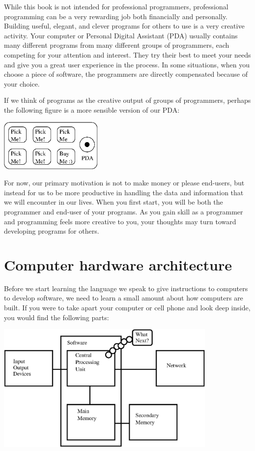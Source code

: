 \documentclass[11pt]{book}
\begin{document}
While this book is not intended for professional programmers, professional
programming can be a very rewarding job both financially and personally.
Building useful, elegant, and clever programs for others to use is a very
creative activity.  Your computer or Personal Digital Assistant (PDA) 
usually contains many different programs from many different groups of 
programmers, each competing for your attention and interest.  They try 
their best to meet your needs and give you a great user experience in the
process.   In some situations, when you choose a piece of software, the 
programmers are directly compensated because of your choice.

If we think of programs as the creative output of groups of programmers,
perhaps the following figure is a more sensible version of our PDA:

\beforefig
\centerline{\includegraphics[height=1.00in]{figs2/pda2.eps}}
\afterfig

For now, our primary motivation is not to make money or please end-users, but
instead for us to be more productive in handling the data and 
information that we will encounter in our lives.
When you first start, you will be both the programmer and end-user of
your programs.  As you gain skill as a programmer and
programming feels more creative to you, your thoughts may turn
toward developing programs for others.

\section{Computer hardware architecture}

Before we start learning the language we 
speak to give instructions to computers to 
develop software, we need to learn a small amount about 
how computers are built.  If you were to take
apart your computer or cell phone and look deep
inside, you would find the following parts:

\beforefig
\centerline{\includegraphics[height=2.50in]{figs2/arch.eps}}
\afterfig
\end{document}

